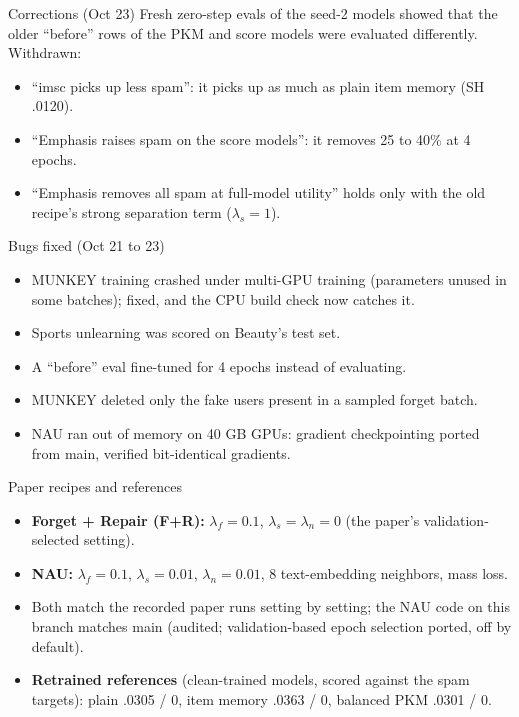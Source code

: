 \documentclass{beamer}
\begin{document}
\begin{frame}{Corrections (Oct 23)}
Fresh zero-step evals of the seed-2 models showed that the older ``before'' rows
of the PKM and score models were evaluated differently. Withdrawn:
\begin{itemize}
  \item ``imsc picks up less spam'': it picks up as much as plain item memory
        (SH .0120).
  \item ``Emphasis raises spam on the score models'': it removes 25 to 40\% at
        4 epochs.
  \item ``Emphasis removes all spam at full-model utility'' holds only with the
        old recipe's strong separation term ($\lambda_s = 1$).
\end{itemize}
\end{frame}

\begin{frame}{Bugs fixed (Oct 21 to 23)}
\begin{itemize}
  \item MUNKEY training crashed under multi-GPU training (parameters unused in
        some batches); fixed, and the CPU build check now catches it.
  \item Sports unlearning was scored on Beauty's test set.
  \item A ``before'' eval fine-tuned for 4 epochs instead of evaluating.
  \item MUNKEY deleted only the fake users present in a sampled forget batch.
  \item NAU ran out of memory on 40 GB GPUs: gradient checkpointing ported from
        main, verified bit-identical gradients.
\end{itemize}
\end{frame}

\begin{frame}{Paper recipes and references}
\begin{itemize}
  \item \textbf{Forget + Repair (F+R):} $\lambda_f = 0.1$, $\lambda_s =
        \lambda_n = 0$ (the paper's validation-selected setting).
  \item \textbf{NAU:} $\lambda_f = 0.1$, $\lambda_s = 0.01$, $\lambda_n =
        0.01$, 8 text-embedding neighbors, mass loss.
  \item Both match the recorded paper runs setting by setting; the NAU code on
        this branch matches main (audited; validation-based epoch selection
        ported, off by default).
  \item \textbf{Retrained references} (clean-trained models, scored against the
        spam targets): plain .0305 / 0, item memory .0363 / 0, balanced PKM
        .0301 / 0.
\end{itemize}
\end{frame}
\end{document}

